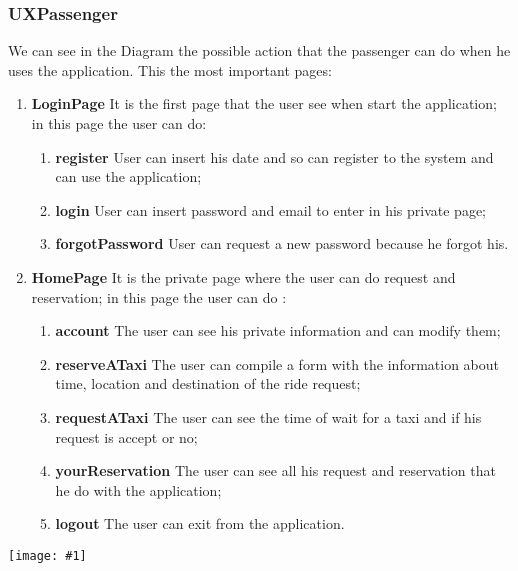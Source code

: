 \documentclass[11pt, a4paper,titlepage]{article}
\newcommand{\image}[1]{
	\begin{center}
		\noindent \texttt{[image: \#1]}
	\end{center}
	}
\begin{document}
	\subsubsection{UXPassenger}
	We can see in the Diagram the possible action that the passenger can do when he uses the application.
	This the most important pages:
	\begin{enumerate}
		\item \textbf{LoginPage} It is the first page that the user see when start the application;
		in this page the user can do:
		\begin{enumerate}
			\item \textbf{register} User can insert his date and so can register to the system and
			can use the application;
			\item \textbf{login} User can insert password and email to enter in his private page;
			\item \textbf{forgotPassword} User can request a new password because he forgot his.
		\end{enumerate}
		\item \textbf{HomePage} It is the private page where the user can do request and
		reservation; in this page the user can do :
		\begin{enumerate}
			\item \textbf{account} The user can see his private information and can modify them;
			\item \textbf{reserveATaxi} The user can compile a form with the information about
			time, location and destination of the ride request;
			\item \textbf{requestATaxi} The user can see the time of wait for a taxi and if his
			request is accept or no;
			\item \textbf{yourReservation} The user can see all his request and reservation that he
			do with the application;
			\item \textbf{logout} The user can exit from the application.
		\end{enumerate}
	\end{enumerate}
	\image{ux_passenger.png}
\end{document}
